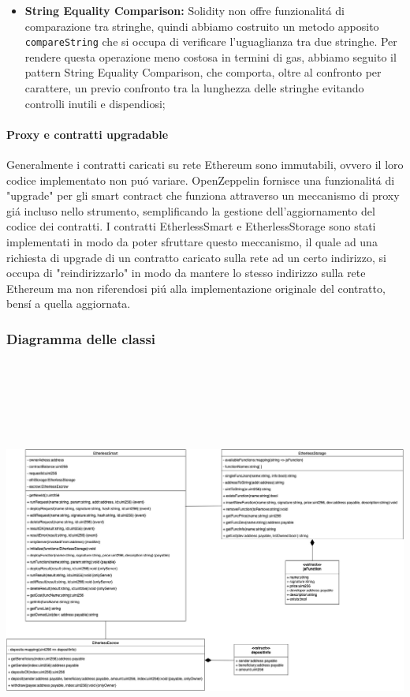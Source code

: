 \begin{itemize}
    \item \textbf{String Equality Comparison:} Solidity non offre funzionalitá di comparazione tra stringhe, quindi abbiamo costruito un metodo apposito \texttt{compareString} che si occupa di verificare l'uguaglianza tra due stringhe. Per rendere questa operazione meno costosa in termini di gas, abbiamo seguito il pattern String Equality Comparison, che comporta, oltre al confronto per carattere, un previo confronto tra la lunghezza delle stringhe evitando controlli inutili e dispendiosi;
  \end{itemize}

  \paragraph{Proxy e contratti upgradable}
    Generalmente i contratti caricati su rete Ethereum sono immutabili, ovvero il loro codice implementato non puó variare. OpenZeppelin fornisce una funzionalitá di "upgrade" per gli smart contract che funziona attraverso un meccanismo di proxy giá incluso nello strumento, semplificando la gestione dell'aggiornamento del codice dei contratti.
    I contratti EtherlessSmart e EtherlessStorage sono stati implementati in modo da poter sfruttare questo meccanismo, il quale ad una richiesta di upgrade di un contratto caricato sulla rete ad un certo indirizzo, si occupa di "reindirizzarlo" in modo da mantere lo stesso indirizzo sulla rete Ethereum ma non riferendosi piú alla implementazione originale del contratto, bensí a quella aggiornata.

\begin{landscape}
\subsubsection{Diagramma delle classi}
  \includegraphics[width=21.5cm, height=14cm]{././diagrammi/etherless-smart/classi/Etherless-smart.jpg}
\end{landscape}
